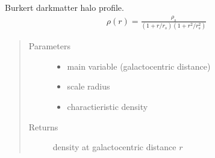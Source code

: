 \documentclass[letterpaper,10pt,english]{sphinxmanual}
\begin{document}
\begin{fulllineitems}
\label{\detokenize{diffsph.profiles:diffsph.profiles.templates.bkrt}}
\sphinxAtStartPar
Burkert dark\sphinxhyphen{}matter halo profile.
\begin{equation*}
\begin{split}\rho(r) = \frac{\rho_s}{(1+r/r_s)(1+r^2/r_s^2)}\end{split}
\end{equation*}\begin{quote}\begin{description}
\item[{Parameters}] \leavevmode\begin{itemize}
\item {} 
\sphinxAtStartPar
{} \textendash{} main variable (galactocentric distance)

\item {} 
\sphinxAtStartPar
{} \textendash{} scale radius

\item {} 
\sphinxAtStartPar
{} \textendash{} charactieristic density

\end{itemize}

\item[{Returns}] \leavevmode
\sphinxAtStartPar
density at galactocentric distance \(r\)

\end{description}\end{quote}

\end{fulllineitems}

\end{document}
